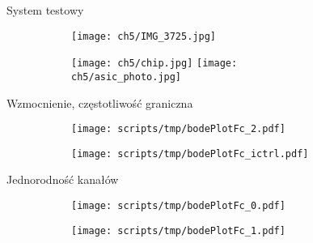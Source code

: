 \begin{frame}{System testowy}

    \begin{figure}[H]
        \centering
        \begin{subfigure}[b]{0.65\textwidth}
            \centering
            \texttt{[image: ch5/IMG\_3725.jpg]}
        \end{subfigure}
        \hfill
        \begin{subfigure}[b]{0.3\textwidth}
            \centering
            \texttt{[image: ch5/chip.jpg]} 
            \texttt{[image: ch5/asic\_photo.jpg]}
        \end{subfigure}     

   \end{figure}
\end{frame}


\begin{frame}{Wzmocnienie, częstotliwość graniczna}

    \begin{figure}[H]
        \centering
        \begin{subfigure}[b]{0.485\textwidth}
            \centering
            \texttt{[image: scripts/tmp/bodePlotFc\_2.pdf]}  
            \caption{}
        \end{subfigure}
        \begin{subfigure}[b]{0.485\textwidth}
            \centering
            \texttt{[image: scripts/tmp/bodePlotFc\_ictrl.pdf]}
            \caption{}
        \end{subfigure}     

    \end{figure}


\end{frame}

\begin{frame}{Jednorodność kanałów}
    \begin{figure}[H]
        \centering
        \begin{subfigure}[b]{0.485\textwidth}
            \centering
            \texttt{[image: scripts/tmp/bodePlotFc\_0.pdf]}
            \caption{}
        \end{subfigure}
        \begin{subfigure}[b]{0.485\textwidth}
            \centering
            \texttt{[image: scripts/tmp/bodePlotFc\_1.pdf]}
            \caption{}
        \end{subfigure}     
    \end{figure}
\end{frame}

